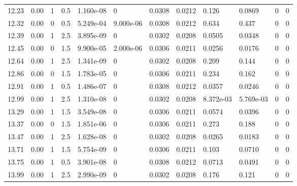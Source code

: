 \documentclass[preview]{standalone}
\begin{document}
{{{\begin{tabular}{L{1.2cm}C{1.2cm} C{0.3cm}C{0.5cm} C{1.4cm}C{1.4cm} C{1.4cm}C{1.4cm} C{1.6cm}C{1.6cm} C{1.6cm}C{1.6cm}}
  12.23  &  0.00  & 1     & 0.5 &  1.160e-08  & 0  &  0.0308&   0.0212& 0.126 & 0.0869   &  0 & 0  \\ 
  12.32  &  0.00  & 0     & 0.5 &  5.249e-04  & 9.000e-06  &  0.0308&   0.0212& 0.634 & 0.437   &  0 & 0  \\ 
  12.39  &  0.00  & 1     & 2.5 &  3.895e-09  & 0  &  0.0302&   0.0208& 0.0505 & 0.0348   &  0 & 0  \\ 
  12.45  &  0.00  & 0     & 1.5 &  9.900e-05  & 2.000e-06  &  0.0306&   0.0211& 0.0256 & 0.0176   &  0 & 0  \\ 
  12.64  &  0.00  & 1     & 2.5 &  1.341e-09  & 0  &  0.0302&   0.0208& 0.209 & 0.144   &  0 & 0  \\ 
  12.86  &  0.00  & 0     & 1.5 &  1.783e-05  & 0  &  0.0306&   0.0211& 0.234 & 0.162   &  0 & 0  \\ 
  12.91  &  0.00  & 1     & 0.5 &  1.486e-07  & 0  &  0.0308&   0.0212& 0.0357 & 0.0246   &  0 & 0  \\ 
  12.99  &  0.00  & 1     & 2.5 &  1.310e-08  & 0  &  0.0302&   0.0208& 8.372e-03 & 5.769e-03   &  0 & 0  \\ 
  13.29  &  0.00  & 1     & 1.5 &  3.549e-08  & 0  &  0.0306&   0.0211& 0.0574 & 0.0396   &  0 & 0  \\ 
  13.37  &  0.00  & 0     & 1.5 &  1.851e-06  & 0  &  0.0306&   0.0211& 0.273 & 0.188   &  0 & 0  \\ 
  13.47  &  0.00  & 1     & 2.5 &  1.628e-08  & 0  &  0.0302&   0.0208& 0.0265 & 0.0183   &  0 & 0  \\ 
  13.71  &  0.00  & 1     & 1.5 &  5.754e-09  & 0  &  0.0306&   0.0211& 0.103 & 0.0710   &  0 & 0  \\ 
  13.75  &  0.00  & 1     & 0.5 &  3.901e-08  & 0  &  0.0308&   0.0212& 0.0713 & 0.0491   &  0 & 0  \\ 
  13.99  &  0.00  & 1     & 2.5 &  2.990e-09  & 0  &  0.0302&   0.0208& 0.176 & 0.121   &  0 & 0  \\ 
\hline 
\end{tabular} 

}}}
\end{document}
